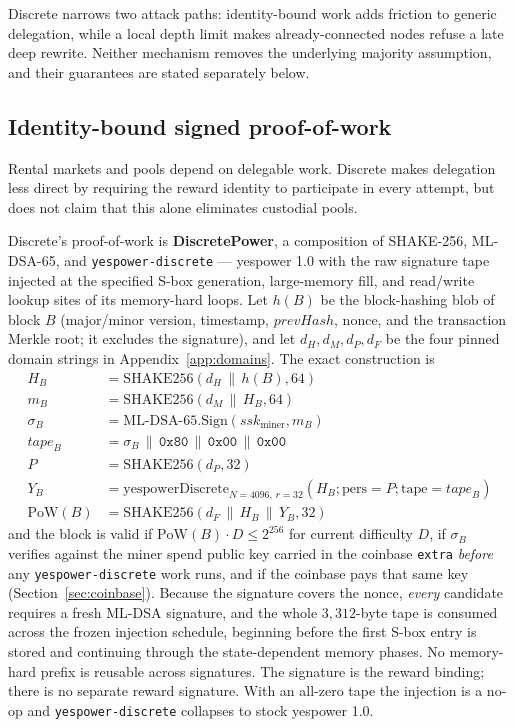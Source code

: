 \documentclass[11pt,a4paper]{article}
\newcommand{\code}[1]{\texttt{\small #1}}
\newcommand{\DSA}{\mathrm{ML\text{-}DSA\text{-}65}}
\newcommand{\concat}{\,\|\,}
\begin{document}
Discrete narrows two attack paths: identity-bound work adds friction to generic
delegation, while a local depth limit makes already-connected nodes refuse a
late deep rewrite. Neither mechanism removes the underlying majority assumption,
and their guarantees are stated separately below.

\subsection{Identity-bound signed proof-of-work}\label{sec:spow}

Rental markets and pools depend on delegable work. Discrete makes delegation
less direct by requiring the reward identity to participate in every attempt,
but does not claim that this alone eliminates custodial pools.

Discrete's proof-of-work is \textbf{DiscretePower}, a composition of
SHAKE-256, ML-DSA-65, and \code{yespower-discrete} --- yespower 1.0 with the raw
signature tape injected at the specified S-box generation, large-memory fill,
and read/write lookup sites of its memory-hard loops.
Let $h(B)$ be the block-hashing blob of block $B$ (major/minor version,
timestamp, $\mathit{prevHash}$, nonce, and the transaction Merkle root; it
excludes the signature), and let $d_H,d_M,d_P,d_F$ be the four pinned domain
strings in Appendix~\ref{app:domains}. The exact construction is
\begin{align}
H_B &= \mathrm{SHAKE256}(d_H \concat h(B), 64) \\
m_B &= \mathrm{SHAKE256}(d_M \concat H_B, 64) \\
\sigma_B &= \DSA.\mathrm{Sign}(\mathit{ssk}_{\mathrm{miner}}, m_B) \\
\mathit{tape}_B &= \sigma_B \concat \mathtt{0x80} \concat \mathtt{0x00} \concat \mathtt{0x00} \\
P &= \mathrm{SHAKE256}(d_P, 32) \\
Y_B &= \mathrm{yespowerDiscrete}_{N=4096,\,r=32}(H_B;\mathrm{pers}=P;\mathrm{tape}=\mathit{tape}_B) \\
\mathrm{PoW}(B) &= \mathrm{SHAKE256}(d_F \concat H_B \concat Y_B, 32)
\label{eq:pow}
\end{align}
and the block is valid if $\mathrm{PoW}(B) \cdot D \le 2^{256}$ for current
difficulty $D$, if $\sigma_B$ verifies against the miner spend public key
carried in the coinbase \code{extra} \emph{before} any \code{yespower-discrete} work runs,
and if the coinbase pays that same key (Section~\ref{sec:coinbase}). Because the
signature covers the nonce, \emph{every} candidate requires a fresh ML-DSA
signature, and the whole $3{,}312$-byte tape is consumed across the frozen
injection schedule, beginning before the first S-box entry is stored and
continuing through the state-dependent memory phases. No memory-hard prefix is
reusable across signatures. The signature is the reward binding; there is no
separate reward signature. With an all-zero tape the injection is a no-op and
\code{yespower-discrete} collapses to stock yespower 1.0.
\end{document}

